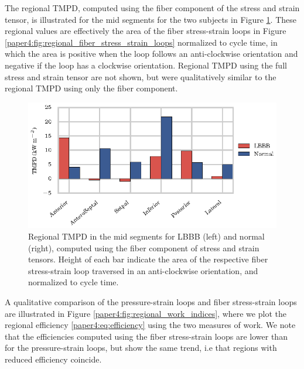 The regional TMPD, computed using the fiber
component of the stress and strain tensor, is illustrated for the mid
segments for the two subjects in Figure
\ref{paper4:fig:regional_power_density}. These regional values are
effectively the area of the fiber stress-strain loops in Figure
\ref{paper4:fig:regional_fiber_stress_strain_loops} normalized to cycle
time, in which the area is positive when the loop follows an
anti-clockwise orientation and negative if the loop has a clockwise
orientation. Regional TMPD using the full stress and strain tensor are
not shown, but were qualitatively similar to the regional TMPD using
only the fiber component.


\begin{figure}[htbp]
  \centering
  \includegraphics{figures/regional_power_density}
  \caption{\label{paper4:fig:regional_power_density} Regional TMPD in the mid
    segments for LBBB (left) and normal (right), computed using the
    fiber component of stress and strain tensors. Height of each bar
    indicate the area of the respective fiber stress-strain loop
    traversed in an anti-clockwise orientation, and normalized to
    cycle time.}  
\end{figure}

A qualitative comparison of the pressure-strain loops and fiber
stress-strain loops are illustrated in Figure
\ref{paper4:fig:regional_work_indices}, where we plot the regional efficiency
\eqref{paper4:eq:efficiency} using the two measures of work. We note that the
efficiencies computed using the fiber stress-strain loops are
lower than for the pressure-strain loops, but show the same trend, i.e
that regions with reduced efficiency coincide.  

